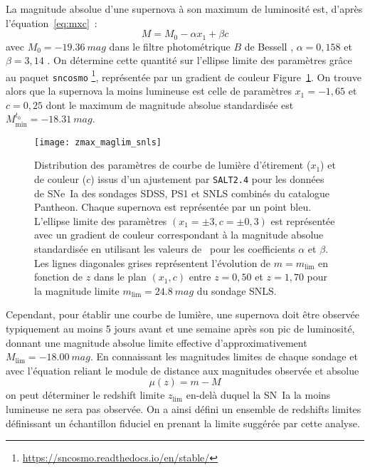 \documentclass[../main/main.tex]{subfiles}
\begin{document}
La magnitude absolue d'une supernova à son maximum de luminosité est, d'après
l'équation~\ref{eq:mxc}~:
\begin{equation*}
    M = M_0 -\alpha x_1 + \beta c
\end{equation*}
avec $M_0 = \SI{-19,36}{mag}$ dans le filtre photométrique $B$ de Bessell
\citep{kessler2009a, scolnic2014}, $\alpha=0,158$ et $\beta=3,14$
\citep[Table 7,][]{scolnic2018}. On détermine cette quantité sur l'ellipse
limite des paramètres grâce au paquet \texttt{sncosmo}
\footnote{\href{https://sncosmo.readthedocs.io/en/stable/}
{https://sncosmo.readthedocs.io/en/stable/}}, représentée par un gradient de
couleur Figure~\ref{fig:maglim}. On trouve alors que la supernova la moins
lumineuse est celle de paramètres $x_1 = -1,65$ et $c = 0,25$ dont le maximum de
magnitude absolue standardisée est $M_{\min}^{t_0}=\SI{-18,31}{mag}$.

\begin{figure}
    \centering
    \texttt{[image: zmax\_maglim\_snls]}
    \caption[Distribution et limite des paramètres de courbe de lumière
    d'étirement ($x_1$) et de couleur ($c$) des sondages SDSS, PS1 et SNLS
    combinés du catalogue Pantheon]{Distribution des paramètres de courbe de
        lumière d'étirement ($x_1$) et de couleur ($c$) issus d'un ajustement
        par \texttt{SALT2.4} pour les données de SNe~Ia des sondages SDSS, PS1 et
        SNLS combinés du catalogue Pantheon. Chaque supernova est représentée par un
        point bleu. L'ellipse limite des paramètres $(x_1=\pm3, c=\pm0,3)$ est
        représentée avec un gradient de couleur correspondant à la magnitude
        absolue standardisée en utilisant les valeurs de~\cite{scolnic2018} pour
        les coefficients $\alpha$ et $\beta$. Les lignes diagonales grises
        représentent l'évolution de $m = m_{\lim}$ en fonction de $z$ dans le
        plan $(x_1,c)$ entre $z=0,50$ et $z=1,70$ pour la magnitude limite
    $m_{\lim}=\SI{24,8}{mag}$ du sondage SNLS.}
    \label{fig:maglim}
\end{figure}

Cependant, pour établir une courbe de lumière, une supernova doit être observée
typiquement au moins 5 jours avant et une semaine après son pic de luminosité,
donnant une magnitude absolue limite effective d'approximativement $M_{\lim}
= \SI{-18,00}{mag}$. En connaissant les magnitudes limites de chaque sondage et
avec l'équation reliant le module de distance aux magnitudes observée et
absolue
\begin{equation}\label{eq:distmod}
    \mu(z) = m - M
\end{equation}
on peut déterminer le redshift limite $z_{\lim}$ en-delà duquel la SN~Ia la
moins lumineuse ne sera pas observée. On a ainsi défini un ensemble de redshifts
limites définissant un échantillon fiduciel en prenant la limite suggérée par
cette analyse.
\end{document}

